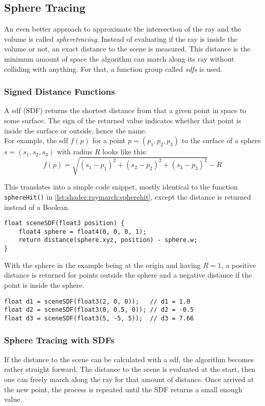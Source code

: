 \pagebreak
\subsection{Sphere Tracing}
An even better approach to approximate the intersection of the ray and the volume is called \textit{\gls{spheretracing}}. 
Instead of evaluating if the ray is inside the volume or not, an exact distance to the scene is measured. This distance is the minimum amount of space the algorithm can march along its ray without colliding with anything.
For that, a function group called \textit{\gls{sdf}s} is used.

\subsubsection{Signed Distance Functions}
A \gls{sdf} (SDF) returns the shortest distance from that a given point in space to some surface.
The sign of the returned value indicates whether that point is inside the surface or outside, hence the name.
\\
For example, the \gls{sdf} $f(p)$ for a point $p=(p_1, p_2, p_3)$ to the surface of a sphere $s=(s_1, s_2, s_3)$ with radius $R$ looks like this:
$$ f(p) = \sqrt{(s_1 - p_1)^2 + (s_2 - p_2)^2 + (s_3 - p_3)^2} - R $$

\noindent
This translates into a simple code snippet, mostly identical to the function \lstinline[language=HLSL]{sphereHit()} in \autoref{lst:shader:raymarch:spherehit}, except the distance is returned instead of a Boolean.
\begin{lstlisting}[language=HLSL, caption=Implementation of a signed distance function for a sphere., label=lst:shader:raymarch:spheredistance]
float sceneSDF(float3 position) {
    float4 sphere = float4(0, 0, 0, 1);
    return distance(sphere.xyz, position) - sphere.w;
}
\end{lstlisting}

\noindent
With the sphere in the example being at the origin and having $R = 1$, a positive distance is returned for points outside the sphere and a negative distance if the point is inside the sphere.
\begin{lstlisting}[language=HLSL]
float d1 = sceneSDF(float3(2, 0, 0));   // d1 = 1.0
float d2 = sceneSDF(float3(0, 0.5, 0)); // d2 = -0.5
float d3 = sceneSDF(float3(5, -5, 5));  // d3 = 7.66
\end{lstlisting}

\subsubsection{Sphere Tracing with SDFs}
If the distance to the scene can be calculated with a \gls{sdf}, the algorithm becomes rather straight forward. The distance to the scene is evaluated at the start, then one can freely march along the ray for that amount of distance. Once arrived at the new point, the process is repeated until the SDF returns a small enough value.

